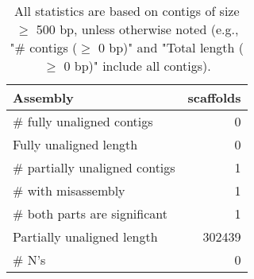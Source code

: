 \documentclass[12pt,a4paper]{article}
\begin{document}
\begin{table}[ht]
\begin{center}
\caption{All statistics are based on contigs of size $\geq$ 500 bp, unless otherwise noted (e.g., "\# contigs ($\geq$ 0 bp)" and "Total length ($\geq$ 0 bp)" include all contigs).}
\begin{tabular}{|l*{1}{|r}|}
\hline
Assembly & scaffolds \\ \hline
\# fully unaligned contigs & 0 \\ \hline
Fully unaligned length & 0 \\ \hline
\# partially unaligned contigs & 1 \\ \hline
\hspace{5mm}\# with misassembly & 1 \\ \hline
\hspace{5mm}\# both parts are significant & 1 \\ \hline
Partially unaligned length & 302439 \\ \hline
\# N's & 0 \\ \hline
\end{tabular}
\end{center}
\end{table}
\end{document}
